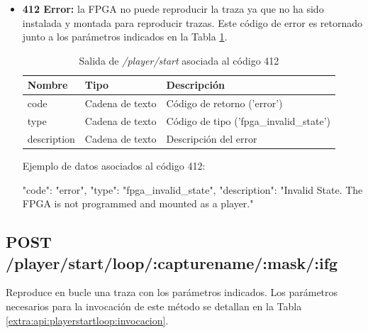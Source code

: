 \begin{itemize}
{\begin{minipage}{\textwidth}
Ejemplo de datos asociados al código 400:

\begin{code}[language=json]
{
  "code": "error",
  "type": "notification",
  "description": "Invalid parameters. The FPGA could not start playing a capture."
}
\end{code}
\end{minipage}
}

\item{\textbf{412 Error:} la \gls{FPGA} no puede reproducir la \gls{traza} ya que no ha sido instalada y montada para reproducir \glspl{traza}. Este código de error es retornado junto a los parámetros indicados en la Tabla \ref{extra:api:playerstart:error412}.
\begin{table}[H]
\centering
\begin{tabular}{|l|l|l|}
\hline
\rowcolor[HTML]{F5F5F5}
\textbf{Nombre}  & \textbf{Tipo}   & \textbf{Descripción}                    \\ \hline
code             & Cadena de texto & Código de retorno ('error')             \\ \hline
type             & Cadena de texto & Código de tipo ('fpga\_invalid\_state') \\ \hline
description      & Cadena de texto & Descripción del error                   \\ \hline
\end{tabular}
\caption{Salida de \textit{/player/start} asociada al código 412}
\label{extra:api:playerstart:error412}
\end{table}

\begin{minipage}{\textwidth}
Ejemplo de datos asociados al código 412:

\begin{code}[language=json]
{
  "code": "error",
  "type": "fpga_invalid_state",
  "description": "Invalid State. The FPGA is not programmed and mounted as a player."
}
\end{code}
\end{minipage}
}

\end{itemize}

%
%
\subsection{POST /player/start/loop/:capturename/:mask/:ifg}
Reproduce en bucle una \gls{traza} con los parámetros indicados. Los parámetros necesarios para la invocación de este método se detallan en la Tabla \ref{extra:api:playerstartloop:invocacion}.

